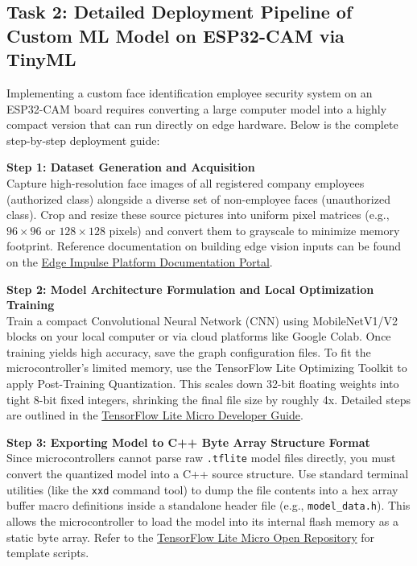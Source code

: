 \documentclass[12pt,a4paper]{article}
\begin{document}
\newpage

\subsection*{Task 2: Detailed Deployment Pipeline of Custom ML Model on ESP32-CAM via TinyML}

Implementing a custom face identification employee security system on an ESP32-CAM board requires converting a large computer model into a highly compact version that can run directly on edge hardware. Below is the complete step-by-step deployment guide:

\vspace{0.3cm}

\noindent \textbf{Step 1: Dataset Generation and Acquisition}\\
Capture high-resolution face images of all registered company employees (authorized class) alongside a diverse set of non-employee faces (unauthorized class). Crop and resize these source pictures into uniform pixel matrices (e.g., $96\times96$ or $128\times128$ pixels) and convert them to grayscale to minimize memory footprint. Reference documentation on building edge vision inputs can be found on the \href{https://docs.edgeimpulse.com/}{Edge Impulse Platform Documentation Portal}.

\vspace{0.3cm}

\noindent \textbf{Step 2: Model Architecture Formulation and Local Optimization Training}\\
Train a compact Convolutional Neural Network (CNN) using MobileNetV1/V2 blocks on your local computer or via cloud platforms like Google Colab. Once training yields high accuracy, save the graph configuration files. To fit the microcontroller's limited memory, use the TensorFlow Lite Optimizing Toolkit to apply Post-Training Quantization. This scales down 32-bit floating weights into tight 8-bit fixed integers, shrinking the final file size by roughly 4x. Detailed steps are outlined in the \href{https://www.tensorflow.org/lite/microcontrollers}{TensorFlow Lite Micro Developer Guide}.

\vspace{0.3cm}

\noindent \textbf{Step 3: Exporting Model to C++ Byte Array Structure Format}\\
Since microcontrollers cannot parse raw \texttt{.tflite} model files directly, you must convert the quantized model into a C++ source structure. Use standard terminal utilities (like the \texttt{xxd} command tool) to dump the file contents into a hex array buffer macro definitions inside a standalone header file (e.g., \texttt{model\_data.h}). This allows the microcontroller to load the model into its internal flash memory as a static byte array. Refer to the \href{https://github.com/tensorflow/tflite-micro}{TensorFlow Lite Micro Open Repository} for template scripts.
\end{document}
